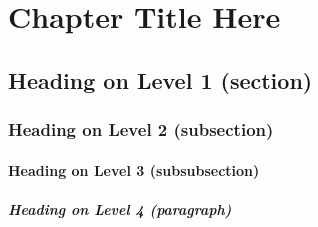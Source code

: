 
\chapter{Chapter Title Here}\label{chapterX}

\lipsum[1]


\section{Heading on Level 1 (section)}

\lipsum[2]


\subsection{Heading on Level 2 (subsection)}

\lipsum[3]


\subsubsection{Heading on Level 3 (subsubsection)}

\lipsum[4]


\paragraph{Heading on Level 4 (paragraph)}

\lipsum[5]


